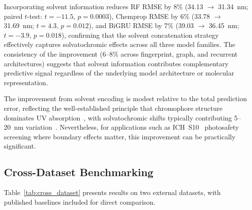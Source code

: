 \documentclass[11pt,a4paper]{article}
\begin{document}
Incorporating solvent information reduces RF RMSE by 8\% (34.13 $\to$ 31.34~nm; paired $t$-test: $t = -11.5$, $p = 0.0003$), Chemprop RMSE by 6\% (33.78 $\to$ 31.69~nm; $t = 4.3$, $p = 0.012$), and BiGRU RMSE by 7\% (39.03 $\to$ 36.45~nm; $t = -3.9$, $p = 0.018$), confirming that the solvent concatenation strategy effectively captures solvatochromic effects across all three model families.
The consistency of the improvement (6--8\% across fingerprint, graph, and recurrent architectures) suggests that solvent information contributes complementary predictive signal regardless of the underlying model architecture or molecular representation.

The improvement from solvent encoding is modest relative to the total prediction error, reflecting the well-established principle that chromophore structure dominates UV absorption~\cite{flemingMolecular2010}, with solvatochromic shifts typically contributing 5--20~nm variation~\cite{reichardt2011solvents}.
Nevertheless, for applications such as ICH~S10~\cite{ICH2013S10} photosafety screening where boundary effects matter, this improvement can be practically significant.


\subsection{Cross-Dataset Benchmarking}
\label{sec:cross_dataset}

Table~\ref{tab:cross_dataset} presents results on two external datasets, with published baselines included for direct comparison.
\end{document}
